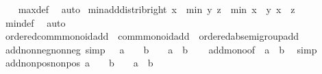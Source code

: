 \begin{isabellebody}
%
\isadelimproof
\ \ %
\endisadelimproof
%
\isatagproof
{}\isamarkupfalse%
\ max{\isacharunderscore}{\kern0pt}def\ \isamarkupfalse%
\ auto%
\endisatagproof
{\isafoldproof}%
%
\isadelimproof
\isanewline
%
\endisadelimproof
\isanewline
{}\isamarkupfalse%
\ min{\isacharunderscore}{\kern0pt}add{\isacharunderscore}{\kern0pt}distrib{\isacharunderscore}{\kern0pt}right{\isacharcolon}{\kern0pt}\ {\isachardoublequoteopen}x\ {\isacharplus}{\kern0pt}\ min\ y\ z\ {\isacharequal}{\kern0pt}\ min\ {\isacharparenleft}{\kern0pt}x\ {\isacharplus}{\kern0pt}\ y{\isacharparenright}{\kern0pt}\ {\isacharparenleft}{\kern0pt}x\ {\isacharplus}{\kern0pt}\ z{\isacharparenright}{\kern0pt}{\isachardoublequoteclose}\isanewline
%
\isadelimproof
\ \ %
\endisadelimproof
%
\isatagproof
{}\isamarkupfalse%
\ min{\isacharunderscore}{\kern0pt}def\ \isamarkupfalse%
\ auto%
\endisatagproof
{\isafoldproof}%
%
\isadelimproof
\isanewline
%
\endisadelimproof
\isanewline
{}\isamarkupfalse%
%
\isadelimdocument
%
\endisadelimdocument
%
\isatagdocument
%
\isamarkuptrue%
%
\endisatagdocument
{\isafolddocument}%
%
\isadelimdocument
%
\endisadelimdocument
{}\isamarkupfalse%
\ ordered{\isacharunderscore}{\kern0pt}comm{\isacharunderscore}{\kern0pt}monoid{\isacharunderscore}{\kern0pt}add\ {\isacharequal}{\kern0pt}\ comm{\isacharunderscore}{\kern0pt}monoid{\isacharunderscore}{\kern0pt}add\ {\isacharplus}{\kern0pt}\ ordered{\isacharunderscore}{\kern0pt}ab{\isacharunderscore}{\kern0pt}semigroup{\isacharunderscore}{\kern0pt}add\isanewline
{}\isanewline
\isanewline
{}\isamarkupfalse%
\ add{\isacharunderscore}{\kern0pt}nonneg{\isacharunderscore}{\kern0pt}nonneg\ {\isacharbrackleft}{\kern0pt}simp{\isacharbrackright}{\kern0pt}{\isacharcolon}{\kern0pt}\ {\isachardoublequoteopen}{}\ {\isasymle}\ a\ {\isasymLongrightarrow}\ {}\ {\isasymle}\ b\ {\isasymLongrightarrow}\ {}\ {\isasymle}\ a\ {\isacharplus}{\kern0pt}\ b{\isachardoublequoteclose}\isanewline
%
\isadelimproof
\ \ %
\endisadelimproof
%
\isatagproof
{}\isamarkupfalse%
\ add{\isacharunderscore}{\kern0pt}mono{\isacharbrackleft}{\kern0pt}of\ {}\ a\ {}\ b{\isacharbrackright}{\kern0pt}\ \isamarkupfalse%
\ simp%
\endisatagproof
{\isafoldproof}%
%
\isadelimproof
\isanewline
%
\endisadelimproof
\isanewline
{}\isamarkupfalse%
\ add{\isacharunderscore}{\kern0pt}nonpos{\isacharunderscore}{\kern0pt}nonpos{\isacharcolon}{\kern0pt}\ {\isachardoublequoteopen}a\ {\isasymle}\ {}\ {\isasymLongrightarrow}\ b\ {\isasymle}\ {}\ {\isasymLongrightarrow}\ a\ {\isacharplus}{\kern0pt}\ b\ {\isasymle}\ {}{\isachardoublequoteclose}\isanewline

\end{isabellebody}

